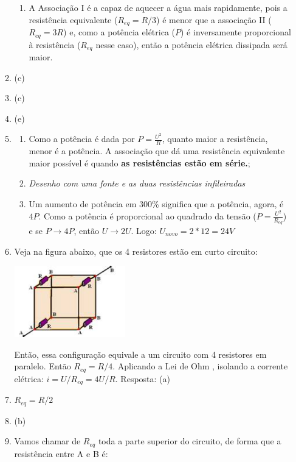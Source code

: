 \documentclass[12pt,letterpaper,fleqn]{article}
\begin{document}
\begin{itemize}
\begin{enumerate}
\begin{enumerate}
                \item A Associação I é a capaz de aquecer a água mais rapidamente, pois a resistência equivalente ($R_{eq} = R/3$) é menor que a associação II ($R_{eq}=3R$) e, como a potência elétrica ($P$) é inversamente proporcional à resistência ($R_{eq}$ nesse caso), então a potência elétrica dissipada será maior.
            \end{enumerate}
            \item (c)
            \item (c)
            \item (e)
            \item \begin{enumerate}
                \item Como a potência é dada por $P=\frac{U^2}{R}$, quanto maior a resistência, menor é a potência. A associação que dá uma resistência equivalente maior possível é quando \textbf{as resistências estão em série.};
                \item \textit{Desenho com uma fonte e as duas resistências infileiradas}
                \item Um aumento de potência em 300\% significa que a potência, agora, é $4P$. Como a potência é proporcional ao quadrado da tensão ($P = \frac{U^2}{R_{eq}}$) e se $P \rightarrow 4P$, então $U \rightarrow 2U$. 
                Logo: $U_{novo}=2*12 = 24 V$
            \end{enumerate}
            \item Veja na figura abaixo, que os 4 resistores estão em curto circuito:
            
            \includegraphics[width=0.4\textwidth]{sol_fuvest_32.jpg}
            
            Então, essa configuração equivale a um circuito com 4 resistores em paralelo. Então $R_{eq}= R/4$. Aplicando a Lei de Ohm , isolando a corrente elétrica: $i=U/R_{eq} = 4U/R$. Resposta: (a)
            
            \item $R_{eq}=R/2$
            \item (b)
            \item Vamos chamar de $R_{eq}$ toda a parte superior do circuito, de forma que a resistência entre A e B é:
            

\end{enumerate}
\end{itemize}
\end{document}
